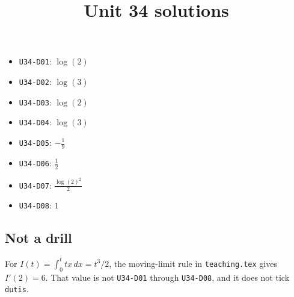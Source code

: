 \title{Unit 34 solutions}\maketitle\begin{itemize}
  \item \texttt{U34-D01}: $\log{\left(2 \right)}$
  \item \texttt{U34-D02}: $\log{\left(3 \right)}$
  \item \texttt{U34-D03}: $\log{\left(2 \right)}$
  \item \texttt{U34-D04}: $\log{\left(3 \right)}$
  \item \texttt{U34-D05}: $- \frac{1}{9}$
  \item \texttt{U34-D06}: $\frac{1}{2}$
  \item \texttt{U34-D07}: $\frac{\log{\left(2 \right)}^{2}}{2}$
  \item \texttt{U34-D08}: $1$
\end{itemize}
\subsection*{Not a drill}
For $I(t)=\int_0^t tx\,dx=t^3/2$, the moving-limit rule in \texttt{teaching.tex} gives $I'(2)=6$. That value is not \texttt{U34-D01} through \texttt{U34-D08}, and it does not tick \texttt{dutis}.

